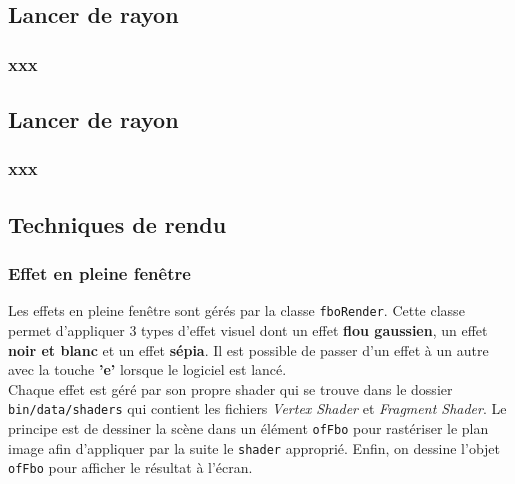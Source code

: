 \subsection{Lancer de rayon}
\subsubsection{xxx}

\subsection{Lancer de rayon}
\subsubsection{xxx}

\subsection{Techniques de rendu}
\subsubsection{Effet en pleine fenêtre}
Les effets en pleine fenêtre sont gérés par la classe \texttt{fboRender}. Cette classe permet d'appliquer 3 types d'effet visuel dont un effet \textbf{flou gaussien}, un effet \textbf{noir et blanc} et un effet \textbf{sépia}. Il est possible de passer d'un effet à un autre avec la touche \textbf{'e'} lorsque le logiciel est lancé. \\

Chaque effet est géré par son propre shader qui se trouve dans le dossier \texttt{bin/data/shaders} qui contient les fichiers \textit{Vertex Shader} et \textit{Fragment Shader}. Le principe est de dessiner la scène dans un élément \texttt{ofFbo} pour rastériser le plan image afin d'appliquer par la suite le \texttt{shader} approprié. Enfin, on dessine l'objet \texttt{ofFbo} pour afficher le résultat à l'écran.


